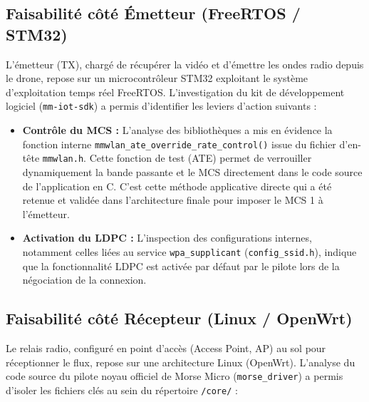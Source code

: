 \subsection{Faisabilité côté Émetteur (FreeRTOS / STM32)}
L'émetteur (TX), chargé de récupérer la vidéo et d'émettre les ondes radio depuis le drone, repose sur 
un microcontrôleur STM32 exploitant le système d'exploitation temps réel 
FreeRTOS. L'investigation du kit de développement logiciel (\texttt{mm-iot-sdk}) 
a permis d'identifier les leviers d'action suivants :
\begin{itemize}
    \item \textbf{Contrôle du MCS :} L'analyse des bibliothèques a mis en évidence la fonction interne 
    \texttt{mmwlan\_ate\_override\_rate\_control()} issue du fichier d'en-tête \texttt{mmwlan.h}. 
    Cette fonction de test (ATE) permet de verrouiller dynamiquement la bande passante et le MCS 
    directement dans le code source de l'application en C. C'est cette méthode applicative directe 
    qui a été retenue et validée dans l'architecture finale pour imposer le MCS 1 à l'émetteur.
    \item \textbf{Activation du LDPC :} L'inspection des configurations internes, notamment celles 
    liées au service \texttt{wpa\_supplicant} (\texttt{config\_ssid.h}), indique que la fonctionnalité 
    LDPC est activée par défaut par le pilote lors de la négociation de la connexion.
\end{itemize}

\subsection{Faisabilité côté Récepteur (Linux / OpenWrt)}
Le relais radio, configuré en point d'accès (Access Point, AP) au sol pour réceptionner le flux, 
repose sur une architecture Linux (OpenWrt). L'analyse du code source du pilote noyau 
officiel de Morse Micro (\texttt{morse\_driver}) a permis d'isoler les fichiers clés au sein du répertoire \texttt{/core/} :

